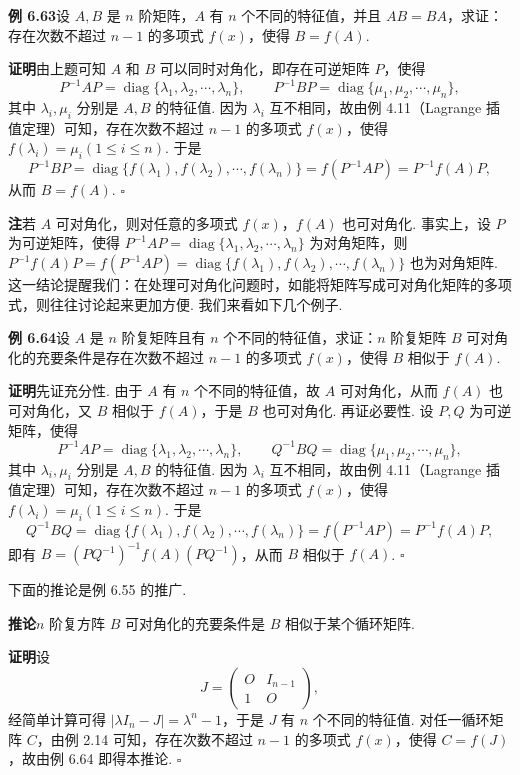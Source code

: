 \documentclass[UTF8,12pt,a4paper,fontset=fandol]{ctexart}
\begin{document}
\noindent\textbf{例 6.63}\quad 设 $A,B$ 是 $n$ 阶矩阵，$A$ 有 $n$ 个不同的特征值，并且 $AB=BA$，求证：存在次数不超过 $n-1$ 的多项式 $f(x)$，使得 $B=f(A)$.

\noindent\textbf{证明}\quad 由上题可知 $A$ 和 $B$ 可以同时对角化，即存在可逆矩阵 $P$，使得
\[
P^{-1}AP=\operatorname{diag}\{\lambda_1,\lambda_2,\cdots,\lambda_n\},\qquad
P^{-1}BP=\operatorname{diag}\{\mu_1,\mu_2,\cdots,\mu_n\},
\]
其中 $\lambda_i,\mu_i$ 分别是 $A,B$ 的特征值. 因为 $\lambda_i$ 互不相同，故由例 4.11（Lagrange 插值定理）可知，存在次数不超过 $n-1$ 的多项式 $f(x)$，使得 $f(\lambda_i)=\mu_i(1\le i\le n)$. 于是
\[
P^{-1}BP=\operatorname{diag}\{f(\lambda_1),f(\lambda_2),\cdots,f(\lambda_n)\}
=f(P^{-1}AP)=P^{-1}f(A)P,
\]
从而 $B=f(A)$. $\square$

\noindent\textbf{注}\quad 若 $A$ 可对角化，则对任意的多项式 $f(x)$，$f(A)$ 也可对角化. 事实上，设 $P$ 为可逆矩阵，使得 $P^{-1}AP=\operatorname{diag}\{\lambda_1,\lambda_2,\cdots,\lambda_n\}$ 为对角矩阵，则 $P^{-1}f(A)P=f(P^{-1}AP)=\operatorname{diag}\{f(\lambda_1),f(\lambda_2),\cdots,f(\lambda_n)\}$ 也为对角矩阵. 这一结论提醒我们：在处理可对角化问题时，如能将矩阵写成可对角化矩阵的多项式，则往往讨论起来更加方便. 我们来看如下几个例子.

\noindent\textbf{例 6.64}\quad 设 $A$ 是 $n$ 阶复矩阵且有 $n$ 个不同的特征值，求证：$n$ 阶复矩阵 $B$ 可对角化的充要条件是存在次数不超过 $n-1$ 的多项式 $f(x)$，使得 $B$ 相似于 $f(A)$.

\noindent\textbf{证明}\quad 先证充分性. 由于 $A$ 有 $n$ 个不同的特征值，故 $A$ 可对角化，从而 $f(A)$ 也可对角化，又 $B$ 相似于 $f(A)$，于是 $B$ 也可对角化. 再证必要性. 设 $P,Q$ 为可逆矩阵，使得
\[
P^{-1}AP=\operatorname{diag}\{\lambda_1,\lambda_2,\cdots,\lambda_n\},\qquad
Q^{-1}BQ=\operatorname{diag}\{\mu_1,\mu_2,\cdots,\mu_n\},
\]
其中 $\lambda_i,\mu_i$ 分别是 $A,B$ 的特征值. 因为 $\lambda_i$ 互不相同，故由例 4.11（Lagrange 插值定理）可知，存在次数不超过 $n-1$ 的多项式 $f(x)$，使得 $f(\lambda_i)=\mu_i(1\le i\le n)$. 于是
\[
Q^{-1}BQ=\operatorname{diag}\{f(\lambda_1),f(\lambda_2),\cdots,f(\lambda_n)\}
=f(P^{-1}AP)=P^{-1}f(A)P,
\]
即有 $B=(PQ^{-1})^{-1}f(A)(PQ^{-1})$，从而 $B$ 相似于 $f(A)$. $\square$

下面的推论是例 6.55 的推广.

\noindent\textbf{推论}\quad $n$ 阶复方阵 $B$ 可对角化的充要条件是 $B$ 相似于某个循环矩阵.

\noindent\textbf{证明}\quad 设
\[
J=\left(\begin{array}{cc}
O & I_{n-1}\\
1 & O
\end{array}\right),
\]
经简单计算可得 $|\lambda I_n-J|=\lambda^n-1$，于是 $J$ 有 $n$ 个不同的特征值. 对任一循环矩阵 $C$，由例 2.14 可知，存在次数不超过 $n-1$ 的多项式 $f(x)$，使得 $C=f(J)$，故由例 6.64 即得本推论. $\square$
\end{document}
